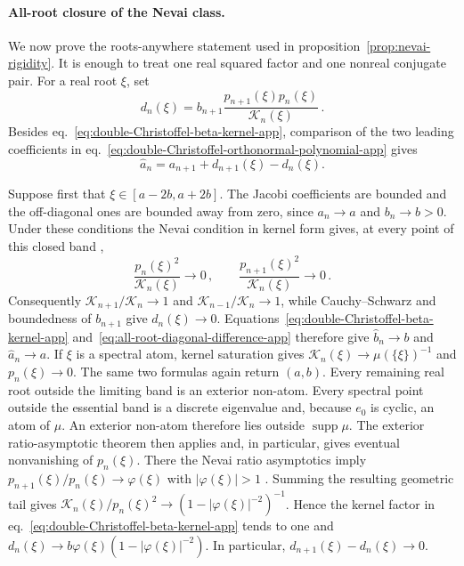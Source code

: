 \documentclass[a4paper,11pt]{article}
\theoremstyle{definition}
\theoremstyle{remark}
\newcommand{\supp}{\operatorname{supp}}
\begin{document}
\paragraph{All-root closure of the Nevai class.}
\label{app:all-root-nevai-proof}
We now prove the roots-anywhere statement used in
proposition~\ref{prop:nevai-rigidity}.  It is enough to treat one real squared factor and one
nonreal conjugate pair.  For a real root $\xi$, set
\begin{equation}
   d_n(\xi)=b_{n+1}
   \frac{p_{n+1}(\xi)p_n(\xi)}{\mathcal K_n(\xi)}\,.
   \label{eq:all-root-endpoint-contraction-app}
\end{equation}
Besides eq.~\eqref{eq:double-Christoffel-beta-kernel-app}, comparison of the two leading
coefficients in eq.~\eqref{eq:double-Christoffel-orthonormal-polynomial-app} gives
\begin{equation}
   \widehat a_n=a_{n+1}+d_{n+1}(\xi)-d_n(\xi).
   \label{eq:all-root-diagonal-difference-app}
\end{equation}

Suppose first that $\xi\in[a-2b,a+2b]$.  The Jacobi coefficients are bounded and the
off-diagonal ones are bounded away from zero, since $a_n\to a$ and $b_n\to b>0$.  Under these
conditions the Nevai condition in kernel form gives, at every point of this closed band
\cite{Nevai1979,BreuerLastSimon2009},
\begin{equation}
   \frac{p_n(\xi)^2}{\mathcal K_n(\xi)}\longrightarrow0\,,
   \qquad
   \frac{p_{n+1}(\xi)^2}{\mathcal K_n(\xi)}\longrightarrow0\,.
   \label{eq:nevai-condition-full-band-app}
\end{equation}
Consequently $\mathcal K_{n+1}/\mathcal K_n\to1$ and
$\mathcal K_{n-1}/\mathcal K_n\to1$, while Cauchy--Schwarz and boundedness of $b_{n+1}$ give
$d_n(\xi)\to0$.  Equations~\eqref{eq:double-Christoffel-beta-kernel-app}
and~\eqref{eq:all-root-diagonal-difference-app} therefore give
$\widehat b_n\to b$ and $\widehat a_n\to a$.
If $\xi$ is a spectral atom, kernel saturation gives
$\mathcal K_n(\xi)\to\mu(\{\xi\})^{-1}$ and $p_n(\xi)\to0$.  The same two formulas again return
$(a,b)$.  Every remaining real root outside the limiting band is an exterior non-atom. 
Every spectral point outside the essential band is a discrete eigenvalue and, because $e_0$ is cyclic, an atom of $\mu$. An exterior non-atom therefore lies outside $\supp\mu$. The exterior ratio-asymptotic theorem then applies and, in particular, gives eventual nonvanishing of $p_n(\xi)$.  There the
Nevai ratio asymptotics imply
$p_{n+1}(\xi)/p_n(\xi)\to\varphi(\xi)$ with $|\varphi(\xi)|>1$
\cite{Nevai1979,SimonOPRL1}.
Summing the resulting geometric tail gives
$\mathcal K_n(\xi)/p_n(\xi)^2\to(1-|\varphi(\xi)|^{-2})^{-1}$.  Hence the kernel factor in
eq.~\eqref{eq:double-Christoffel-beta-kernel-app} tends to one and
$d_n(\xi)\to b\varphi(\xi)(1-|\varphi(\xi)|^{-2})$.  In particular,
$d_{n+1}(\xi)-d_n(\xi)\to0$.
\end{document}
